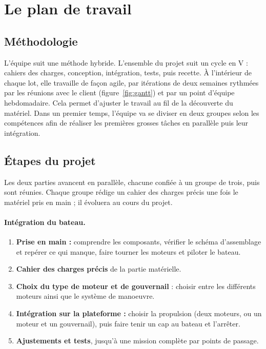 \section{Le plan de travail}
\label{sec:plan-travail}

\subsection{Méthodologie}

L'équipe suit une méthode hybride. L'ensemble du projet suit un cycle en V : cahiers des charges, conception, intégration, tests, puis recette. À l'intérieur de chaque lot, elle travaille de façon agile, par itérations de deux semaines rythmées par les réunions avec le client (figure~\ref{fig:gantt}) et par un point d'équipe hebdomadaire. Cela permet d'ajuster le travail au fil de la découverte du matériel. Dans un premier temps, l'équipe va se diviser en deux groupes selon les compétences afin de réaliser les premières grosses tâches en parallèle puis leur intégration.

\subsection{Étapes du projet}

Les deux parties avancent en parallèle, chacune confiée à un groupe de trois, puis sont réunies. Chaque groupe rédige un cahier des charges précis une fois le matériel pris en main ; il évoluera au cours du projet.
\\
\paragraph{Intégration du bateau.}
\begin{enumerate}
  \item \textbf{Prise en main :} comprendre les composants, vérifier le schéma d'assemblage et repérer ce qui manque, faire tourner les moteurs et piloter le bateau.
  \item \textbf{Cahier des charges précis} de la partie matérielle.
  \item \textbf{Choix du type de moteur et de gouvernail} : choisir entre les différents moteurs ainsi que le système de manoeuvre.
  \item \textbf{Intégration sur la plateforme :} choisir la propulsion (deux moteurs, ou un moteur et un gouvernail), puis faire tenir un cap au bateau et l'arrêter.
  \item \textbf{Ajustements et tests}, jusqu'à une mission complète par points de passage.
\end{enumerate}

